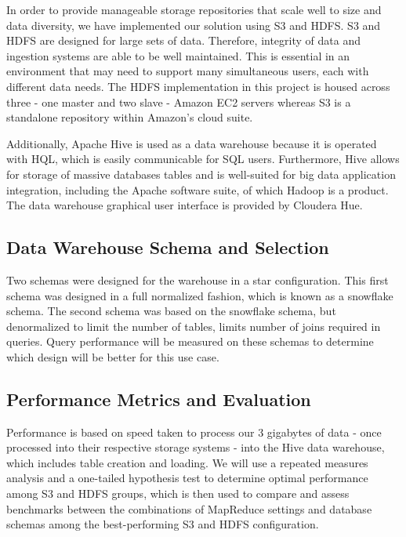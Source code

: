 \documentclass[journal]{IEEEtran}
\begin{document}
In order to provide manageable storage repositories that scale 
 well to size and data diversity, 
 we have implemented our solution using S3 and HDFS. 
S3 and HDFS are designed for large sets of data. 
Therefore, integrity of data and ingestion systems are able
 to be well maintained. 
This is essential in an environment that may need to support 
 many simultaneous users, each with different data needs. 
The HDFS implementation in this project is housed across three 
 - one master and two slave - Amazon EC2 servers 
 whereas S3 is a standalone repository within Amazon's cloud suite.

Additionally, Apache Hive is used as a data warehouse 
 because it is operated with HQL, 
 which is easily communicable for SQL users. 
Furthermore, Hive allows for storage of massive databases tables and
 is well-suited for big data application integration, 
 including the Apache software suite, of which Hadoop is a product. 
The data warehouse graphical user interface is provided by Cloudera Hue.

\subsection{Data Warehouse Schema and Selection}

Two schemas were designed for the warehouse in a star configuration.
This first schema was designed in a full normalized fashion,
 which is known as a snowflake schema.
The second schema was based on the snowflake schema, 
 but denormalized to limit the number of tables, 
 limits number of joins required in queries.
Query performance will be measured on these schemas to determine
 which design will be better for this use case. 


\subsection{Performance Metrics and Evaluation}

Performance is based on speed taken to process our 3 gigabytes of data 
 - once processed into their respective storage systems - 
 into the Hive data warehouse, which includes table creation and loading. 
We will use a repeated measures analysis and a one-tailed hypothesis 
 test to determine optimal performance among S3 and HDFS groups, 
 which is then used to compare and assess benchmarks between the 
 combinations of MapReduce settings and database schemas among the
 best-performing S3 and HDFS configuration.
\end{document}
